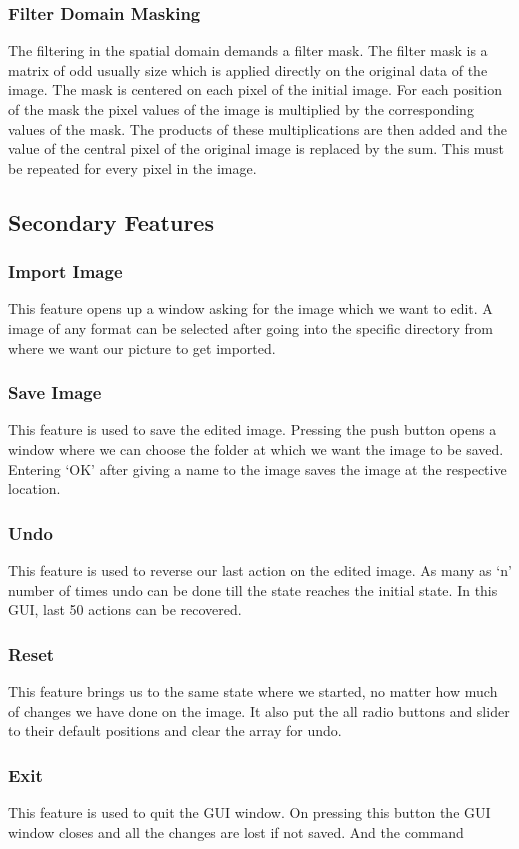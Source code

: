 \subsubsection{Filter Domain Masking}
The filtering in the spatial domain demands a filter mask. The filter mask is a matrix of odd usually size which is applied directly on the original data of the image. The mask is centered on each pixel of the initial image. For each position of the mask the pixel values of the image is multiplied by the corresponding values of the mask. The products of these multiplications are then added and the value of the central pixel of the original image is replaced by the sum. This must be repeated for every pixel in the image.
\\

\subsection{Secondary Features}
\subsubsection{Import Image}
This feature opens up a window asking for the image which we want to edit. A image of any format can be selected after going into the specific directory from where we want our picture to get imported.
\\

\subsubsection{Save Image}
This feature is used to save the edited image. Pressing the push button opens a window where we can choose the folder at which we want the image to be saved. Entering ‘OK’ after giving a name to the image saves the image at the respective location.
\\

\subsubsection{Undo}
This feature is used to reverse our last action on the edited image. As many as ‘n’ number of times undo can be done till the state reaches the initial state. In this GUI, last 50 actions can be recovered.
\\

\subsubsection{Reset}
This feature brings us to the same state where we started, no matter how much of changes we have done on the image. It also put the all radio buttons and slider to their default positions and clear the array for undo.
\\

\subsubsection{Exit}
This feature is used to quit the GUI window. On pressing this button the GUI window closes and all the changes are lost if not saved. And the command 
\\

